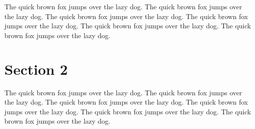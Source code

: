 \documentclass[11pt,a4paper]{report}
\begin{document}
The quick brown fox jumps over the lazy dog. The quick brown fox jumps over the lazy dog. The quick brown fox jumps over the lazy dog. The quick brown fox jumps over the lazy dog. The quick brown fox jumps over the lazy dog. The quick brown fox jumps over the lazy dog.

\section{Section 2}
\label{sec:sec2}

The quick brown fox jumps over the lazy dog. The quick brown fox jumps over the lazy dog. The quick brown fox jumps over the lazy dog. The quick brown fox jumps over the lazy dog. The quick brown fox jumps over the lazy dog. The quick brown fox jumps over the lazy dog.


\printbibliography[title={References}]
\end{document}
